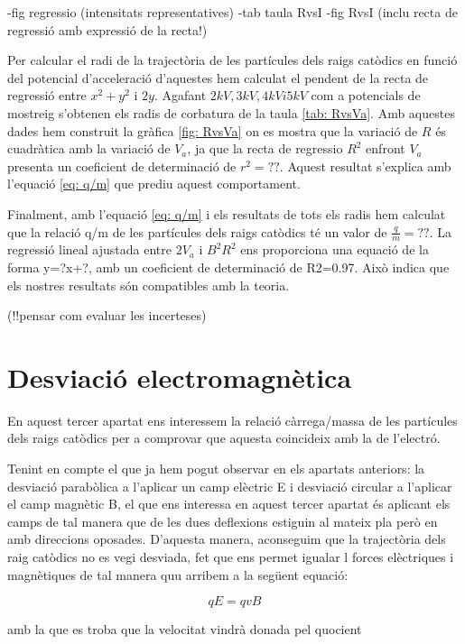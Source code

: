 \documentclass[11pt]{article}
\begin{document}
-fig regressio (intensitats representatives)
-tab taula RvsI 
-fig RvsI (inclu recta de regressió amb expressió de la recta!)

Per calcular el radi de la trajectòria de les partícules dels raigs catòdics en funció del potencial d'acceleració d'aquestes hem calculat el pendent de la recta de regressió entre $x^2+y^2$ i $2y$. Agafant $2kV, 3kV, 4kV i 5kV$ com a potencials  de mostreig s'obtenen els radis de corbatura de la taula \ref{tab: RvsVa}. Amb aquestes dades hem construit la gràfica \ref{fig: RvsVa} on es mostra que la variació de $R$ és cuadràtica amb la variació de $V_a$, ja que la recta de regressio $R^2$ enfront $V_a$ presenta un coeficient de determinació de  $r^2=??$. Aquest resultat s'explica amb l'equació \ref{eq: q/m} que prediu aquest comportament.

Finalment, amb l'equació \ref{eq: q/m} i els resultats de tots els radis hem calculat que la relació q/m de les partícules dels raigs catòdics té un valor de $\frac{q}{m}=??$.
La regressió lineal ajustada entre $2V_a$ i $B^2R^2$ ens proporciona una equació de la forma y=?x+?, amb un coeficient de determinació de R2=0.97. Això indica que els nostres resultats són compatibles amb la teoria.


(!!pensar com evaluar les incerteses)

\section{Desviació electromagnètica}\label{sec: desv_em}

En aquest tercer apartat ens interessem la relació càrrega/massa de les partícules dels raigs catòdics per a comprovar que aquesta coincideix amb la de l'electró. 

Tenint en compte el que ja hem pogut observar en els apartats anteriors: la desviació parabòlica a l'aplicar un camp elèctric E i desviació circular a l'aplicar el camp magnètic B, el que ens interessa en aquest tercer apartat és aplicant els camps de tal manera que de les dues deflexions estiguin al mateix pla però en amb direccions oposades. D'aquesta manera, aconseguim que la trajectòria dels raig catòdics no es vegi desviada, fet que ens permet igualar l forces elèctriques i magnètiques de tal manera quu arribem a la següent equació:

\begin{equation}\label{eq: Fm=Fe}
    qE = qvB
\end{equation}

amb la que es troba que la velocitat vindrà donada pel quocient
\end{document}
